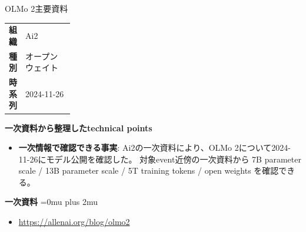 \begin{technicalnote}{OLMo 2}{主要資料}
\begingroup
\begin{tabularx}{\linewidth}{@{}>{\bfseries}p{0.22\linewidth}X@{}}
組織 & Ai2 \\
種別 & オープンウェイト \\
時系列 & 2024-11-26 \\
\end{tabularx}
\smallskip
{\bfseries 一次資料から整理したtechnical points}
\begin{itemize}[leftmargin=1.5em,itemsep=0.35em]
\item \textbf{一次情報で確認できる事実}: Ai2の一次資料により、OLMo 2について2024-11-26にモデル公開を確認した。 対象event近傍の一次資料から 7B parameter scale / 13B parameter scale / 5T training tokens / open weights を確認できる。
\end{itemize}
\begin{minipage}{\linewidth}
\begin{samepage}
{\bfseries 一次資料}
\begingroup\sloppy
\Urlmuskip=0mu plus 2mu\relax
\begin{itemize}[leftmargin=1.5em,itemsep=0.25em]
\item {\scriptsize\url{https://allenai.org/blog/olmo2}}
\end{itemize}
\endgroup
\end{samepage}
\end{minipage}
\endgroup
\end{technicalnote}
\medskip

